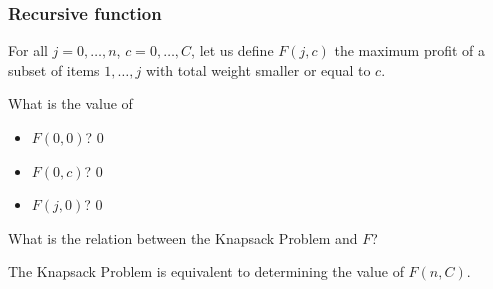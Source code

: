 \documentclass{beamer}
\begin{document}
\begin{frame}
  \frametitle{Recursive function}

  For all $j = 0, \dots, n$, $c = 0, \dots, C$, let us define \alert{$F(j, c)$} the maximum profit of a subset of items $1, \dots, j$ with total weight smaller or equal to $c$.

  \bigskip

  \pause
  What is the value of
  \begin{itemize}
    \item $F(0, 0)$? \pause $0$ \pause
    \item $F(0, c)$? \pause $0$ \pause
    \item $F(j, 0)$? \pause $0$ \pause
  \end{itemize}

  \bigskip

  What is the relation between the Knapsack Problem and $F$? \pause

  The Knapsack Problem is equivalent to determining the value of $F(n, C)$.
\end{frame}
\end{document}
